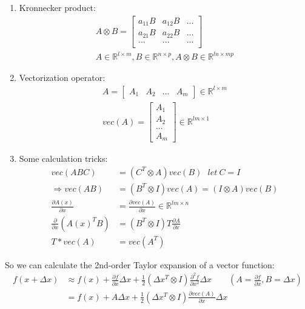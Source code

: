 \begin{enumerate}
    \item Kronnecker product:
    \begin{equation}
        \begin{aligned} A \otimes B = \begin{bmatrix} a_{11}B & a_{12}B & ... \\ a_{21}B & a_{22}B & ... \\ ... & ... & ... \\ \end{bmatrix} \\ A \in \mathbb{R}^{l \times m}, B \in \mathbb{R}^{n \times p}, A \otimes B \in \mathbb{R}^{ln \times mp} \end{aligned}
    \end{equation}
    \item Vectorization operator:
    \begin{equation}
        \begin{aligned} A = \begin{bmatrix} A_1 & A_2 & ... & A_m \end{bmatrix} \in \mathbb{R}^{l \times m}\\ vec(A) = \begin{bmatrix} A_1 \\ A_2 \\ ... \\ A_m \end{bmatrix} \in \mathbb{R}^{lm \times 1} \end{aligned}
    \end{equation}
    \item Some calculation tricks:
    \begin{equation}
        \begin{aligned} vec(ABC) & = (C^T \otimes A) vec(B) \ \ \ let \ C=I\\ \Rightarrow vec(AB) & = (B^T \otimes I) vec(A) = (I \otimes A) vec(B) \\ \frac{\partial A(x)}{\partial x} & = \frac{\partial vec(A)}{\partial x} \in \mathbb{R}^{lm \times n} \\ \frac{\partial}{\partial x} (A(x)^T B) & = (B^T \otimes I) T \frac{\partial A}{\partial x} \\ T * vec(A) & = vec(A^T) \end{aligned}
    \end{equation}
\end{enumerate}

So we can calculate the 2nd-order Taylor expansion of a vector function:
\begin{equation}
    \begin{aligned} f(x + \Delta x) & \approx f(x) + \frac{\partial f}{\partial x} \Delta x + \frac{1}{2} (\Delta x^T \otimes I) \frac{\partial^2 f}{\partial x^2} \Delta x \qquad (A=\frac{\partial f}{\partial x},B=\Delta x) \\ & = f(x) + A \Delta x + \frac{1}{2} (\Delta x^T \otimes I) \frac{\partial vec(A)}{\partial x} \Delta x \end{aligned}
\end{equation}


